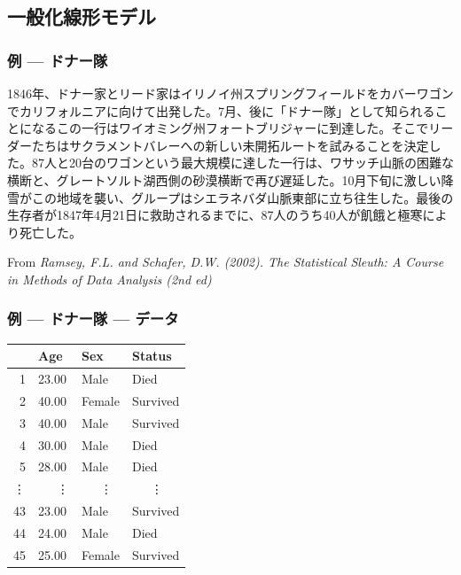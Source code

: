 \subsection{一般化線形モデル}


\begin{frame}
\frametitle{例 --- ドナー隊}

1846年、ドナー家とリード家はイリノイ州スプリングフィールドをカバーワゴンでカリフォルニアに向けて出発した。7月、後に「ドナー隊」として知られることになるこの一行はワイオミング州フォートブリジャーに到達した。そこでリーダーたちはサクラメントバレーへの新しい未開拓ルートを試みることを決定した。87人と20台のワゴンという最大規模に達した一行は、ワサッチ山脈の困難な横断と、グレートソルト湖西側の砂漠横断で再び遅延した。10月下旬に激しい降雪がこの地域を襲い、グループはシエラネバダ山脈東部に立ち往生した。最後の生存者が1847年4月21日に救助されるまでに、87人のうち40人が飢餓と極寒により死亡した。\\


\vfill

{\tiny From \textit{Ramsey, F.L. and Schafer, D.W. (2002). The Statistical Sleuth: A Course in Methods of Data Analysis (2nd ed)}}
\end{frame}



\begin{frame}
\frametitle{例 --- ドナー隊 --- データ}

\begin{center}
\begin{tabular}{rlll}
  \hline
     & Age   & Sex    & Status \\
  \hline
   1 & 23.00 & Male   & Died \\
   2 & 40.00 & Female & Survived \\
   3 & 40.00 & Male   & Survived \\
   4 & 30.00 & Male   & Died \\
   5 & 28.00 & Male   & Died \\
\vdots & ~~~\vdots & ~~~\vdots & ~~~\vdots \\
  43 & 23.00 & Male   & Survived \\
  44 & 24.00 & Male   & Died \\
  45 & 25.00 & Female & Survived \\
   \hline
\end{tabular}
\end{center}

\end{frame}


